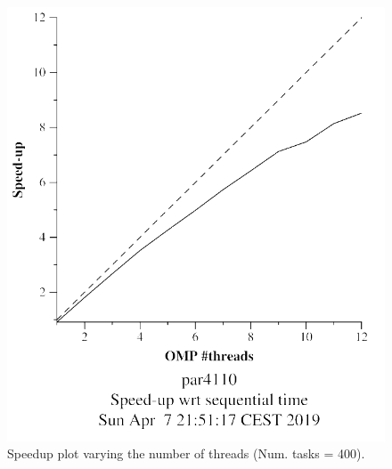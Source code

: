 \documentclass[12pt, a4paper]{article}
\begin{document}
\begin{figure}[H]
\begin{minipage}[b]{0.4\linewidth}
  \includegraphics[scale=0.5]{./mandel-omp-10000-strong-omp-24-400-speedup}
  \caption{Speedup plot varying the number of threads (Num. tasks = 400).}
  \label{fig:mandel-omp-10000-strong-omp-24-400-speedup}
\end{minipage}
\end{figure}
\end{document}
